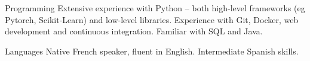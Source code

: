 


\begin{cvskills}

  \cvskill
    {Programming}
    {Extensive experience with Python – both high-level frameworks (eg Pytorch, Scikit-Learn) and low-level libraries.}
  \cvskill
    {}
    {Experience with Git, Docker, web development and continuous integration. Familiar with SQL and Java.}



  \cvskill
    {Languages} %
    {Native French speaker, fluent in English. Intermediate Spanish skills.} %

\end{cvskills}

